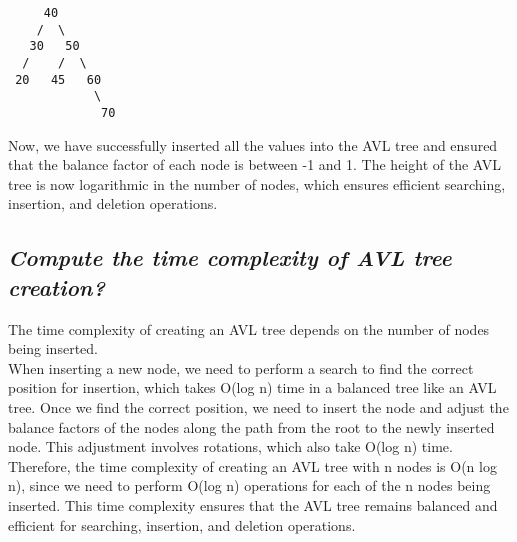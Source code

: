 \documentclass{article}
\begin{document}
\begin{lstlisting}
     40
    /  \
   30   50
  /    /  \
 20   45   60
            \
             70

\end{lstlisting}
Now, we have successfully inserted all the values into the AVL tree and ensured that the balance factor of each node is between -1 and 1. The height of the AVL tree is now logarithmic in the number of nodes, which ensures efficient searching, insertion, and deletion operations.
\subsection{\textit{Compute the time complexity of AVL tree creation?}}
The time complexity of creating an AVL tree depends on the number of nodes being inserted.\\

When inserting a new node, we need to perform a search to find the correct position for insertion, which takes O(log n) time in a balanced tree like an AVL tree. Once we find the correct position, we need to insert the node and adjust the balance factors of the nodes along the path from the root to the newly inserted node. This adjustment involves rotations, which also take O(log n) time.\\

Therefore, the time complexity of creating an AVL tree with n nodes is O(n log n), since we need to perform O(log n) operations for each of the n nodes being inserted. This time complexity ensures that the AVL tree remains balanced and efficient for searching, insertion, and deletion operations.
\end{document}
